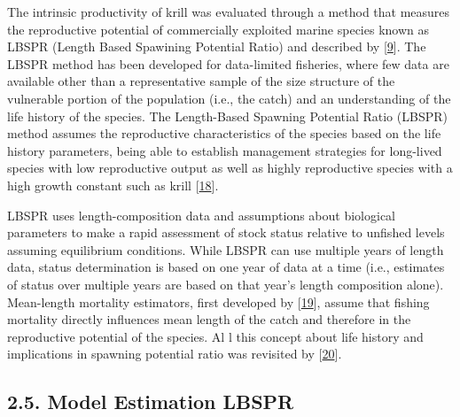 \documentclass[
]{article}
\begin{document}
The intrinsic productivity of krill was evaluated through a method that
measures the reproductive potential of commercially exploited marine
species known as LBSPR (Length Based Spawining Potential Ratio) and
described by {[}\protect\hyperlink{ref-Hordyk2016}{9}{]}. The LBSPR
method has been developed for data-limited fisheries, where few data are
available other than a representative sample of the size structure of
the vulnerable portion of the population (i.e., the catch) and an
understanding of the life history of the species. The Length-Based
Spawning Potential Ratio (LBSPR) method assumes the reproductive
characteristics of the species based on the life history parameters,
being able to establish management strategies for long-lived species
with low reproductive output as well as highly reproductive species with
a high growth constant such as krill
{[}\protect\hyperlink{ref-Prince2018}{18}{]}.

LBSPR uses length-composition data and assumptions about biological
parameters to make a rapid assessment of stock status relative to
unfished levels assuming equilibrium conditions. While LBSPR can use
multiple years of length data, status determination is based on one year
of data at a time (i.e., estimates of status over multiple years are
based on that year's length composition alone). Mean-length mortality
estimators, first developed by
{[}\protect\hyperlink{ref-Beverton1957}{19}{]}, assume that fishing
mortality directly influences mean length of the catch and therefore in
the reproductive potential of the species. Al l this concept about life
history and implications in spawning potential ratio was revisited by
{[}\protect\hyperlink{ref-Jensen1996}{20}{]}.

\hypertarget{model-estimation-lbspr}{%
\subsection{2.5. Model Estimation LBSPR}\label{model-estimation-lbspr}}
\end{document}
